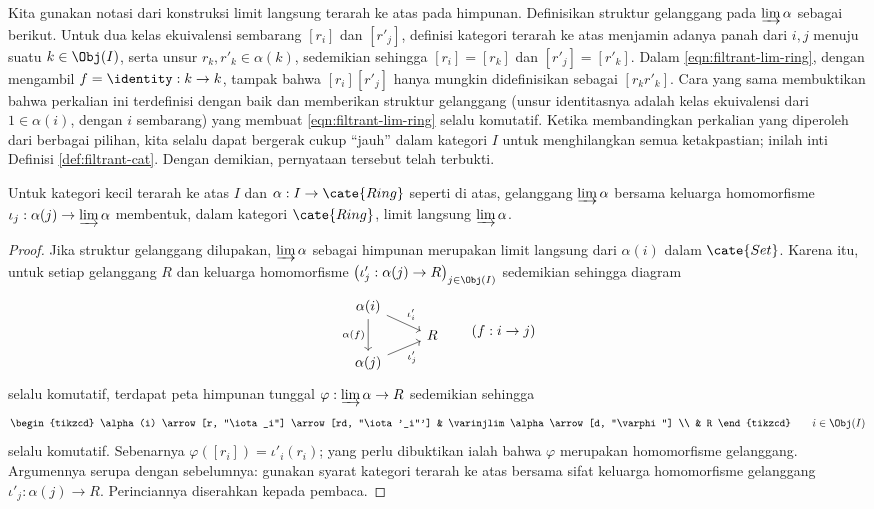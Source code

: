 Kita gunakan notasi dari konstruksi limit langsung terarah ke atas pada himpunan. Definisikan struktur gelanggang pada $\varinjlim \alpha$ sebagai berikut. Untuk dua kelas ekuivalensi sembarang $[r_i]$ dan $[r'_j]$, definisi kategori terarah ke atas menjamin adanya panah dari $i,j$ menuju suatu $k \in \Obj(I)$, serta unsur $r_k, r'_k \in \alpha(k)$, sedemikian sehingga $[r_i] = [r_k]$ dan $[r'_j] = [r'_k]$. Dalam \eqref{eqn:filtrant-lim-ring}, dengan mengambil $f = \identity: k \to k$, tampak bahwa $[r_i][r'_j]$ hanya mungkin didefinisikan sebagai $[r_k r'_k]$. Cara yang sama membuktikan bahwa perkalian ini terdefinisi dengan baik dan memberikan struktur gelanggang (unsur identitasnya adalah kelas ekuivalensi dari $1 \in \alpha(i)$, dengan $i$ sembarang) yang membuat \eqref{eqn:filtrant-lim-ring} selalu komutatif. Ketika membandingkan perkalian yang diperoleh dari berbagai pilihan, kita selalu dapat bergerak cukup “jauh” dalam kategori $I$ untuk menghilangkan semua ketakpastian; inilah inti Definisi \ref{def:filtrant-cat}. Dengan demikian, pernyataan tersebut telah terbukti.

\begin{proposition}\label{prop:ring-filtrant-limit}
	Untuk kategori kecil terarah ke atas $I$ dan $\alpha: I \to \cate{Ring}$ seperti di atas, gelanggang $\varinjlim \alpha$ bersama keluarga homomorfisme $\iota_j: \alpha(j) \to \varinjlim \alpha$ membentuk, dalam kategori $\cate{Ring}$, limit langsung $\varinjlim \alpha$.
\end{proposition}
\begin{proof}
	Jika struktur gelanggang dilupakan, $\varinjlim \alpha$ sebagai himpunan merupakan limit langsung dari $\alpha(i)$ dalam $\cate{Set}$. Karena itu, untuk setiap gelanggang $R$ dan keluarga homomorfisme $\left( \iota'_j: \alpha(j) \to R \right)_{j \in \Obj(I)}$ sedemikian sehingga diagram
	\[ \begin{tikzcd}[row sep=tiny]
		\alpha(i) \arrow[dd, "\alpha(f)"'] \arrow[rd, "\iota'_i"] & \\
		& R \\
		\alpha(j) \arrow[ru, "\iota'_j"'] &
		\end{tikzcd} \qquad (f: i \to j) \]
	selalu komutatif, terdapat peta himpunan tunggal $\varphi: \varinjlim \alpha \to R$ sedemikian sehingga
	\[ \begin{tikzcd}
		\alpha(i) \arrow[r, "\iota_i"] \arrow[rd, "\iota'_i"'] & \varinjlim \alpha \arrow[d, "\varphi"] \\
		& R
	\end{tikzcd} \qquad i \in \Obj(I) \]
	selalu komutatif. Sebenarnya $\varphi([r_i]) = \iota'_i(r_i)$; yang perlu dibuktikan ialah bahwa $\varphi$ merupakan homomorfisme gelanggang. Argumennya serupa dengan sebelumnya: gunakan syarat kategori terarah ke atas bersama sifat keluarga homomorfisme gelanggang $\iota'_j: \alpha(j) \to R$. Perinciannya diserahkan kepada pembaca.
\end{proof}

